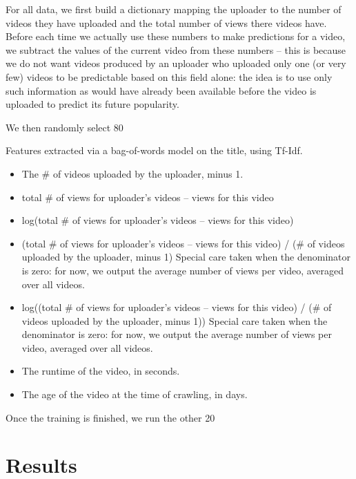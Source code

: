 \documentclass{article} %
\begin{document}
For all data, we first build a dictionary mapping the uploader to the number of videos they have uploaded and the total number of views there videos have.  Before each time we actually use these numbers to make predictions for a video, we subtract the values of the current video from these numbers – this is because we do not want videos produced by an uploader who uploaded only one (or very few) videos to be predictable based on this field alone: the idea is to use only such information as would have already been available before the video is uploaded to predict its future popularity.

We then randomly select 80%

Features extracted via a bag-of-words model on the title, using Tf-Idf.

\begin{itemize}
\item
The \# of videos uploaded by the uploader, minus 1.
\item
total \# of views for uploader's videos – views for this video
\item
log(total \# of views for uploader's videos – views for this video)
\item
(total \# of views for uploader's videos – views for this video) / (\# of videos uploaded by the uploader, minus 1)
Special care taken when the denominator is zero: for now, we output the average number of views per video, averaged over all videos.
\item
log((total \# of views for uploader's videos – views for this video) / (\# of videos uploaded by the uploader, minus 1))
Special care taken when the denominator is zero: for now, we output the average number of views per video, averaged over all videos.
\item
The runtime of the video, in seconds.
\item
The age of the video at the time of crawling, in days.
\end{itemize}

Once the training is finished, we run the other 20%

\section{Results}
\end{document}
